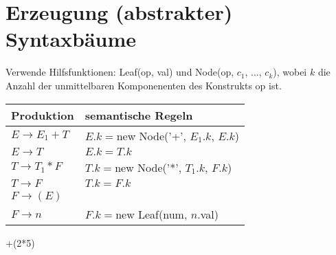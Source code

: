 \section{Erzeugung (abstrakter) Syntaxbäume}
Verwende Hilfsfunktionen: Leaf(op, val) und Node(op, $c_1$, ..., $c_k$), wobei $k$ die Anzahl der unmittelbaren Komponenenten des Konstrukts op ist.
\begin{center}
    \begin{tabular}{l|l}
        Produktion      & semantische Regeln \\\hline
        $E \to E_1 + T$ & $E.k = $new Node('+', $E_1.k$, $E.k$)\\\hline
        $E \to T$       & $E.k = T.k$\\\hline
        $T \to T_1 * F$ & $T.k = $new Node('*', $T_1.k$, $F.k$)\\\hline
        $T \to F$       & $T.k = F.k$\\\hline
        $F \to (E)$     & \\\hline
        $F \to n$       & $F.k = $new Leaf(num, $n$.val)
    \end{tabular}
\end{center}
+(2*5)
    \begin{center}
    \end{center}
    \begin{center}
        \color{red}
         \hspace*{1cm}
         \hspace*{1cm}
    \end{center}

